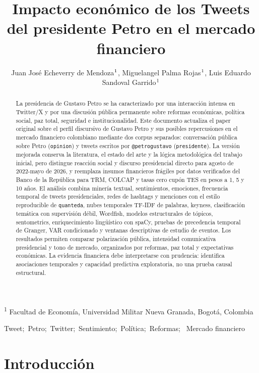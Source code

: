 \documentclass[
]{interact}
\title{Impacto económico de los Tweets del presidente Petro en el
mercado financiero}
\author{Juan José Echeverry de Mendoza$\textsuperscript{1}$, Miguelangel
Palma Rojas$\textsuperscript{1}$, Luis Eduardo Sandoval
Garrido$\textsuperscript{1}$}
\begin{document}
\captionsetup{labelsep=space}
\maketitle
\textsuperscript{1}  Facultad de Economía, Universidad Militar Nueva
Granada, Bogotá, Colombia
\begin{abstract}
La presidencia de Gustavo Petro se ha caracterizado por una interacción
intensa en Twitter/X y por una discusión pública permanente sobre
reformas económicas, política social, paz total, seguridad e
institucionalidad. Este documento actualiza el paper original sobre el
perfil discursivo de Gustavo Petro y sus posibles repercusiones en el
mercado financiero colombiano mediante dos corpus separados:
conversación pública sobre Petro (\texttt{opinion}) y tweets escritos
por \texttt{@petrogustavo} (\texttt{presidente}). La versión mejorada
conserva la literatura, el estado del arte y la lógica metodológica del
trabajo inicial, pero distingue reacción social y discurso presidencial
directo para agosto de 2022-mayo de 2026, y reemplaza insumos
financieros frágiles por datos verificados del Banco de la República
para TRM, COLCAP y tasas cero cupón TES en pesos a 1, 5 y 10 años. El
análisis combina minería textual, sentimientos, emociones, frecuencia
temporal de tweets presidenciales, redes de hashtags y menciones con el
estilo reproducible de \texttt{quanteda}, nubes temporales TF-IDF de
palabras, keyness, clasificación temática con supervisión débil,
Wordfish, modelos estructurales de tópicos, sentometrics,
enriquecimiento lingüístico con spaCy, pruebas de precedencia temporal
de Granger, VAR condicionado y ventanas descriptivas de estudio de
eventos. Los resultados permiten comparar polarización pública,
intensidad comunicativa presidencial y tono de mercado, organizados por
reformas, paz total y expectativas económicas. La evidencia financiera
debe interpretarse con prudencia: identifica asociaciones temporales y
capacidad predictiva exploratoria, no una prueba causal estructural.
\end{abstract}
\begin{keywords}
\def\sep{;\ }
Tweet\sep Petro\sep Twitter\sep Sentimiento\sep Política\sep Reformas\sep 
Mercado financiero
\end{keywords}


\section{Introducción}\label{introducciuxf3n}
\end{document}
